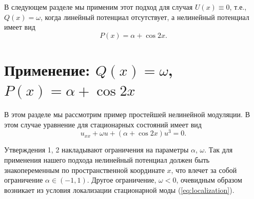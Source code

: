 В следующем разделе мы применим этот подход для случая $U(x) \equiv 0$, т.е., $Q(x) = \omega$, когда линейный потенциал отсутствует, а нелинейный потенциал имеет вид
$$P(x) = \alpha + \cos 2x.$$

\section{Применение: $Q(x) = \omega$, $P(x) = \alpha + \cos 2x$}

В этом разделе мы рассмотрим пример простейшей нелинейной модуляции.
В этом случае уравнение для стационарных состояний имеет вид
%
\begin{equation}
u_{xx} + \omega u + (\alpha + \cos 2x) u^3 = 0.
\label{eq:stationary_obj}
\end{equation}
%

Утверждения 1, 2 накладывают ограничения на параметры $\alpha$, $\omega$.
Так для применения нашего подхода нелинейный потенциал должен быть знакопеременным по пространственной координате $x$, что влечет за собой ограничение $\alpha \in (-1, 1)$.
Другое ограничение, $\omega < 0$, очевидным образом возникает из условия локализации стационарной моды (\ref{eq:localization}).

